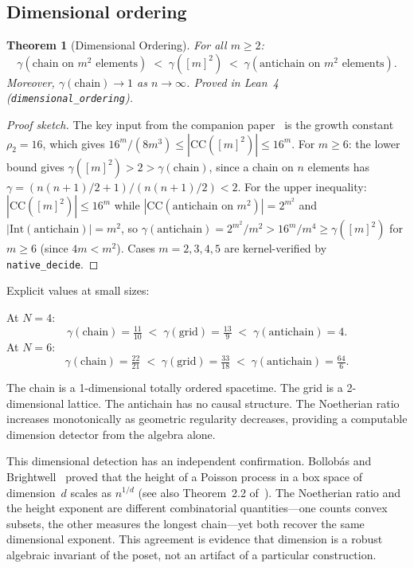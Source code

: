 \documentclass[11pt,a4paper]{article}
\theoremstyle{plain}
\newtheorem{theorem}{Theorem}[section]
\theoremstyle{definition}
\theoremstyle{remark}
\newcommand{\CC}{\mathrm{CC}}
\newcommand{\Int}{\mathrm{Int}}
\begin{document}
\subsection{Dimensional ordering}\label{sec:ordering}

\begin{theorem}[Dimensional Ordering]\label{thm:dim_ordering}
For all $m \geq 2$:
\[
\gamma(\text{chain on $m^2$ elements}) \;<\; \gamma([m]^2) \;<\; \gamma(\text{antichain on $m^2$ elements}).
\]
Moreover, $\gamma(\text{chain}) \to 1$ as $n \to \infty$.
Proved in Lean~4~\cite{leanrepo} (\texttt{dimensional\_ordering}).
\end{theorem}

\begin{proof}[Proof sketch]
The key input from the companion paper~\cite{difiore2026grid} is the
growth constant $\rho_2 = 16$, which gives
$16^m/(8m^3) \leq |\CC([m]^2)| \leq 16^m$.
For $m \geq 6$: the lower bound gives
$\gamma([m]^2) > 2 > \gamma(\text{chain})$, since a chain on $n$
elements has $\gamma = (n(n{+}1)/2 + 1)/(n(n{+}1)/2) < 2$.
For the upper inequality: $|\CC([m]^2)| \leq 16^m$ while
$|\CC(\text{antichain on $m^2$})| = 2^{m^2}$ and
$|\Int(\text{antichain})| = m^2$, so
$\gamma(\text{antichain}) = 2^{m^2}/m^2 > 16^m/m^4 \geq
\gamma([m]^2)$ for $m \geq 6$ (since $4m < m^2$).
Cases $m = 2, 3, 4, 5$ are kernel-verified by \texttt{native\_decide}.
\end{proof}

\noindent Explicit values at small sizes:

At $N = 4$:
\[
\gamma(\text{chain}) = \tfrac{11}{10} \;<\; \gamma(\text{grid}) = \tfrac{13}{9} \;<\; \gamma(\text{antichain}) = 4.
\]
At $N = 6$:
\[
\gamma(\text{chain}) = \tfrac{22}{21} \;<\; \gamma(\text{grid}) = \tfrac{33}{18} \;<\; \gamma(\text{antichain}) = \tfrac{64}{6}.
\]

The chain is a 1-dimensional totally ordered spacetime.
The grid is a 2-dimensional lattice.
The antichain has no causal structure.
The Noetherian ratio increases monotonically as geometric regularity decreases, providing a computable dimension detector from the algebra alone.

This dimensional detection has an independent confirmation.
Bollob\'as and Brightwell~\cite{bollobas1991} proved that the height of a Poisson process in a box space of dimension~$d$ scales as $n^{1/d}$ (see also Theorem~2.2 of~\cite{brightwell2015}).
The Noetherian ratio and the height exponent are different combinatorial quantities---one counts convex subsets, the other measures the longest chain---yet both recover the same dimensional exponent.
This agreement is evidence that dimension is a robust algebraic invariant of the poset, not an artifact of a particular construction.
\end{document}
